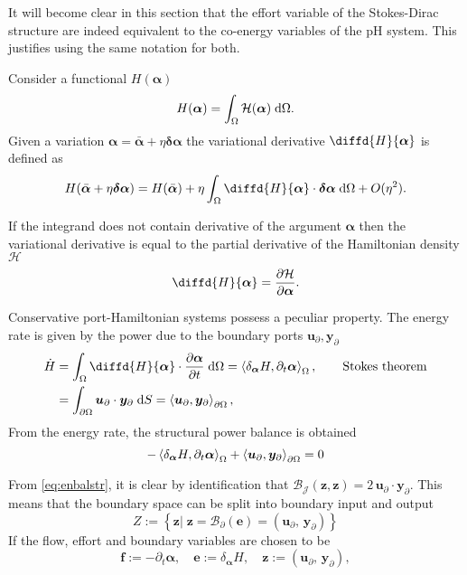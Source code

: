 \begin{remark}
	It will become clear in this section that the effort variable of the Stokes-Dirac structure are indeed equivalent to the co-energy variables of the pH system. This justifies using the same notation for both.
\end{remark}

\begin{definition}
Consider a functional $H(\bm{\alpha})$
\[ H(\bm{\alpha}) = \int_{\Omega} \mathcal{H}(\bm{\alpha}) \d{\Omega}.
\]
Given a variation $\bm{\alpha} = \bar{\bm{\alpha}} + \eta \bm{\delta\alpha}$ the variational derivative $\diffd{H}{\bm{\alpha}}$ is defined as
\[
H(\bar{\bm{\alpha}} + \eta \bm{\delta\alpha}) = H(\bar{\bm{\alpha}}) + \eta \int_{\Omega} \diffd{H}{\bm{\alpha}} \cdot \bm{\delta\alpha} \d{\Omega} + O(\eta^2).
\]
\end{definition}
\begin{remark}
If the integrand does not contain derivative of the argument $\bm{\alpha}$ then the variational derivative is equal to the partial derivative of the Hamiltonian density $\mathcal{H}$
\[
\diffd{H}{\bm{\alpha}} = \diffp{\mathcal{H}}{\bm{\alpha}}.
\]
\end{remark}


Conservative port-Hamiltonian systems possess a peculiar property. The energy rate is given by the power due to the boundary ports $\bm{u}_\partial, \bm{y}_\partial$
\begin{equation}\label{eq:enrate}
\begin{aligned}
\dot{H} &= \int_{\Omega} \diffd{H}{\bm{\alpha}} \cdot \diffp{\bm{\alpha}}{t} \d{\Omega} =\inner[\Omega]{\dder{H}{\bm{\alpha}}}{\pder{\bm{\alpha}}{t}}, \qquad \text{Stokes theorem}\\
&=\int_{\partial \Omega} \bm{u}_\partial \cdot \bm{y}_\partial \d{S} =\inner[\partial \Omega]{\bm{u}_\partial}{\bm{y}_\partial},
\end{aligned}
\end{equation} 
From the energy rate, the structural power balance is obtained
\begin{equation}\label{eq:strpow}
-\inner[\Omega]{\dder{H}{\bm{\alpha}}}{\pder{\bm{\alpha}}{t}} + \inner[\partial \Omega]{\bm{u}_\partial}{\bm{y}_\partial} = 0
\end{equation}


From \eqref{eq:enbalstr}, it is clear by identification that $\mathcal{B}_{\mathcal{J}}(\bm{z}, \bm{z}) = 2\,  \bm{u}_\partial \cdot \bm{y}_\partial$. This means that the boundary space can be split into boundary input and output
\[
{Z} := \left\{ \bm{z} \vert \; \bm{z} = \mathcal{B}_{\partial}(\bm{e}) = (\bm{u}_\partial, \, \bm{y}_\partial) \right\}
\]
If the flow, effort and boundary variables are chosen to be
\begin{equation}
\bm{f}:= -\partial_t \bm{\alpha}, \quad \bm{e}:=\delta_{\bm\alpha} H, \quad \bm{z}:=(\bm{u}_\partial, \, \bm{y}_\partial), 
\end{equation}

